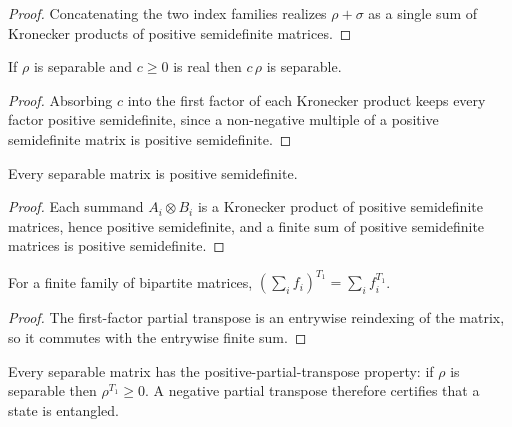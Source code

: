 \begin{proof}
    \leanok
    Concatenating the two index families realizes $\rho+\sigma$ as a single sum of
    Kronecker products of positive semidefinite matrices.
\end{proof}

\begin{theorem}
    \label{thm:is_separable_smul}
    \leanok
    If $\rho$ is separable and $c\ge 0$ is real then $c\,\rho$ is separable.
\end{theorem}

\begin{proof}
    \leanok
    Absorbing $c$ into the first factor of each Kronecker product keeps every factor
    positive semidefinite, since a non-negative multiple of a positive semidefinite
    matrix is positive semidefinite.
\end{proof}

\begin{theorem}
    \label{thm:is_separable_pos_semidef}
    \leanok
    Every separable matrix is positive semidefinite.
\end{theorem}

\begin{proof}
    \leanok
    Each summand $A_i\otimes B_i$ is a Kronecker product of positive semidefinite
    matrices, hence positive semidefinite, and a finite sum of positive semidefinite
    matrices is positive semidefinite.
\end{proof}

\begin{theorem}
    \label{thm:partial_transpose_left_sum}
    \leanok
    For a finite family of bipartite matrices,
    $(\sum_i f_i)^{T_1}=\sum_i f_i^{T_1}$.
\end{theorem}

\begin{proof}
    \leanok
    The first-factor partial transpose is an entrywise reindexing of the matrix, so
    it commutes with the entrywise finite sum.
\end{proof}

\begin{theorem}
    \label{thm:is_separable_is_ppt}
    \leanok
    Every separable matrix has the positive-partial-transpose property:
    if $\rho$ is separable then $\rho^{T_1}\ge 0$. A negative partial transpose
    therefore certifies that a state is entangled.
\end{theorem}

